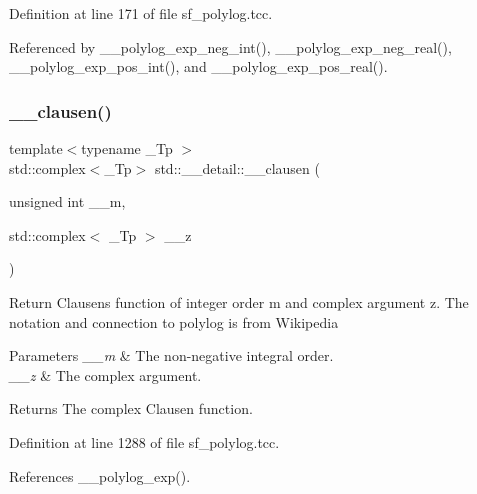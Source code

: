 Definition at line 171 of file sf\+\_\+polylog.\+tcc.



Referenced by \+\_\+\+\_\+polylog\+\_\+exp\+\_\+neg\+\_\+int(), \+\_\+\+\_\+polylog\+\_\+exp\+\_\+neg\+\_\+real(), \+\_\+\+\_\+polylog\+\_\+exp\+\_\+pos\+\_\+int(), and \+\_\+\+\_\+polylog\+\_\+exp\+\_\+pos\+\_\+real().

\mbox{\label{namespacestd_1_1____detail_a8f7e931e2a93b8d298a4df702a5e41ad}} 
\subsubsection{\texorpdfstring{\+\_\+\+\_\+clausen()}{\_\_clausen()}\hspace{0.1cm}{\footnotesize\ttfamily [1/2]}}
{\footnotesize\ttfamily template$<$typename \+\_\+\+Tp $>$ \\
std\+::complex$<$\+\_\+\+Tp$>$ std\+::\+\_\+\+\_\+detail\+::\+\_\+\+\_\+clausen (\begin{DoxyParamCaption}\item[{unsigned int}]{\+\_\+\+\_\+m,  }\item[{std\+::complex$<$ \+\_\+\+Tp $>$}]{\+\_\+\+\_\+z }\end{DoxyParamCaption})}

Return Clausen\textquotesingle{}s function of integer order m and complex argument {\ttfamily z}. The notation and connection to polylog is from Wikipedia


\begin{DoxyParams}{Parameters}
{\em \+\_\+\+\_\+m} & The non-\/negative integral order. \\
\hline
{\em \+\_\+\+\_\+z} & The complex argument. \\
\hline
\end{DoxyParams}
\begin{DoxyReturn}{Returns}
The complex Clausen function. 
\end{DoxyReturn}


Definition at line 1288 of file sf\+\_\+polylog.\+tcc.



References \+\_\+\+\_\+polylog\+\_\+exp().

\mbox{\label{namespacestd_1_1____detail_a07d0f6b515fec03e423e5cecbb7580cd}} 
